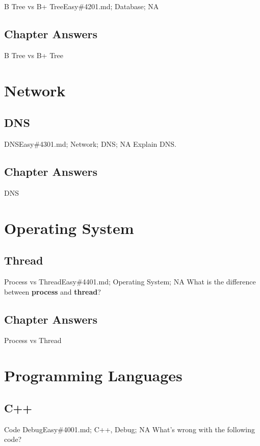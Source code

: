 \documentclass[oldfontcommands]{memoir}
\begin{document}
{\begin{question}{B Tree vs B+ Tree}{Easy}{\#4201.md; Database; NA}
\end{question}

\newpage\section{Chapter Answers}\begin{answer}{B Tree vs B+ Tree}
\end{answer}
\chapter{Network}
\minitoc
\section{DNS}
\begin{question}{DNS}{Easy}{\#4301.md; Network; DNS; NA}
Explain DNS.

\end{question}

\newpage\section{Chapter Answers}\begin{answer}{DNS}
\end{answer}
\chapter{Operating System}
\minitoc
\section{Thread}
\begin{question}{Process vs Thread}{Easy}{\#4401.md; Operating System; NA}
What is the difference between {\bf{process}} and {\bf{thread}}?

\end{question}

\newpage\section{Chapter Answers}\begin{answer}{Process vs Thread}
\end{answer}
\chapter{Programming Languages}
\minitoc
\section{C++}
\begin{question}{Code Debug}{Easy}{\#4001.md; C++, Debug; NA}
What's wrong with the following code?


\end{question}}
\end{document}
